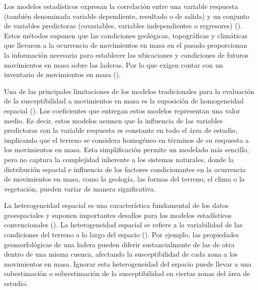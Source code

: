 \documentclass[
  manuscript=article,  
  layout=preprint,  
]{format}
\begin{document}
Los modelos estadísticos expresan la correlación entre una variable respuesta (también denominada variable dependiente, resultado o de salida) y un conjunto de variables predictoras (covariables, variables independientes o regresores) (\cite{dai2001assessment}). Estos métodos suponen que las condiciones geológicas, topográficas y climáticas que llevaron a la ocurrencia de movimientos en masa en el pasado proporcionan la información necesaria para establecer las ubicaciones y condiciones de futuros movimientos en masa sobre las laderas. Por lo que exigen contar con un inventario de movimientos en masa (\cite{dai2001assessment, brabb1984innovative, soeters1996}). 

Una de las principales limitaciones de los modelos tradicionales para la evaluación de la susceptibilidad a movimientos en masa es la suposición de homogeneidad espacial (\cite{lombardo2020space}). Los coeficientes que entregan estos modelos representan una valor medio. Es decir, estos modelos asumen que la influencia de las variables predictoras con la variable respuesta es constante en todo el área de estudio, implicando que el terreno se considera homogéneo en términos de su respuesta a los movimientos en masa.  Esta simplificación permite un modelado más sencillo, pero no captura la complejidad inherente a los sistemas naturales, donde la distribución espacial e influencia de los factores condicionantes en la ocurrencia de movimientos en masa, como la geología, las formas del terreno, el clima o la vegetación, pueden variar de manera significativa.

La heterogeneidad espacial es una característica fundamental de los datos geoespaciales y suponen importantes desafíos para los modelos estadísticos convencionales (\cite{anselin1988spatial, cressie2015statistics, lesage2009introduction}). La heterogeneidad espacial se refiere a la variabilidad de las condiciones del terreno a lo largo del espacio (\cite{anselin1990spatial}). Por ejemplo, las propiedades geomorfológicas de una ladera pueden diferir sustancialmente de las de otra dentro de una misma cuenca, afectando la susceptibilidad de cada zona a los movimientos en masa.  Ignorar esta heterogeneidad del espacio puede llevar a una subestimación o sobrestimación de la susceptibilidad en ciertas zonas del área de estudio.
\end{document}
